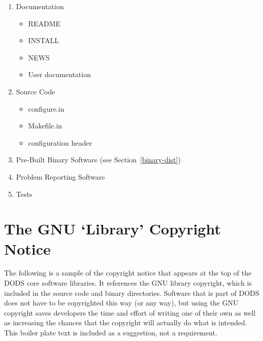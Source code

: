 \begin{enumerate}

\item Documentation

  \begin{itemize}
  \item README
  \item INSTALL
  \item NEWS
  \item User documentation
  \end{itemize}

\item Source Code
  
  \begin{itemize}
  \item configure.in
  \item Makefile.in
  \item configuration header
  \end{itemize}

\item Pre-Built Binary Software (see Section~\ref{binary-dist})

\item Problem Reporting Software

\item Tests

\end{enumerate}

\section{The GNU `Library' Copyright Notice}

The following is a sample of the copyright notice that appears at the top of
the DODS core software libraries. It references the GNU library copyright,
which is included in the source code and binary directories. Software that is
part of DODS does not have to be copyrighted this way (or any way), but using
the GNU copyright saves developers the time and effort of writing one of
their own as well as increasing the chances that the copyright will actually
do what is intended. This boiler plate text is included as a suggestion, not
a requirement.


